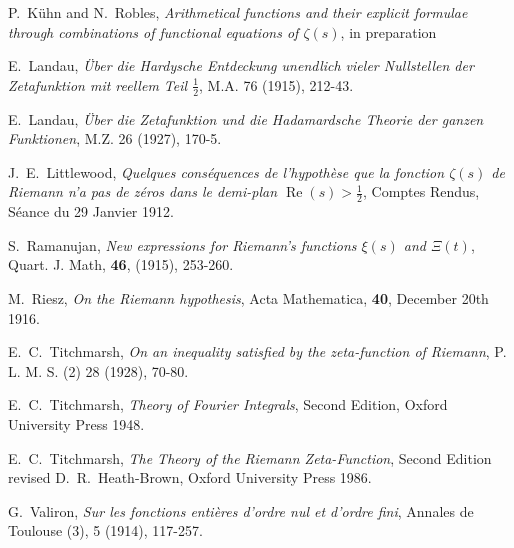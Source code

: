 \documentclass[11pt]{article}
\numberwithin{equation}{section}		 			%
\numberwithin{figure}{section}			 			%
\begin{document}
\begin{thebibliography}{99}
	
	 P.~K\"{u}hn and N.~Robles, \emph{Arithmetical functions and their explicit formulae through combinations of functional equations of $\zeta(s)$}, in preparation
	
	 E.~Landau, \emph{\"{U}ber die Hardysche Entdeckung unendlich vieler Nullstellen der Zetafunktion mit reellem Teil $\tfrac{1}{2}$}, M.A. 76 (1915), 212-43.
	
	 E.~Landau, \emph{\"{U}ber die Zetafunktion und die Hadamardsche Theorie der ganzen Funktionen}, M.Z. 26 (1927), 170-5.
	
	 J.~E.~Littlewood, \emph{Quelques cons\'{e}quences de l'hypoth\`{e}se que la fonction $\zeta(s)$ de Riemann n'a pas de z\'{e}ros dans le demi-plan $\operatorname{Re}(s) > \tfrac{1}{2}$}, Comptes Rendus, S\'{e}ance du 29 Janvier 1912.
	
	
	 S.~Ramanujan, \emph{New expressions for Riemann's functions $\xi(s)$ and $\Xi(t)$}, Quart. J. Math, \textbf{46}, (1915), 253-260.
	
	 M.~Riesz, \emph{On the Riemann hypothesis}, Acta Mathematica, \textbf{40}, December 20th 1916.
	
	 E.~C.~Titchmarsh, \emph{On an inequality satisfied by the zeta-function of Riemann}, P. L. M. S. (2) 28 (1928), 70-80.
	
	 E.~C.~Titchmarsh, \emph{Theory of Fourier Integrals}, Second Edition, Oxford University Press 1948.
	
	 E.~C.~Titchmarsh, \emph{The Theory of the Riemann Zeta-Function}, Second Edition revised D.~R.~Heath-Brown, Oxford University Press 1986.
	
	 G.~Valiron, \emph{Sur les fonctions enti\`{e}res d'ordre nul et d'ordre fini}, Annales de Toulouse (3), 5 (1914), 117-257.
	
	
\end{thebibliography}
\end{document}
